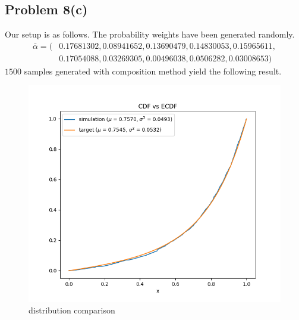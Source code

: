\documentclass{article}
\begin{document}
\subsection*{Problem 8(c)}
Our setup is as follows. The probability weights have been generated randomly.
\begin{align*}
  \bar\alpha = ( & 0.17681302, 0.08941652, 0.13690479, 0.14830053, 0.15965611, \\
                 & 0.17054088, 0.03269305, 0.00496038, 0.0506282,  0.03008653)
\end{align*}
$1500$ samples generated with composition method yield the following result.
\begin{figure}[h!]
    \centering
    \includegraphics[width=\linewidth]{../images/p8c_10_1500.png}
    \caption{distribution comparison}
\end{figure}
\newpage
\end{document}

